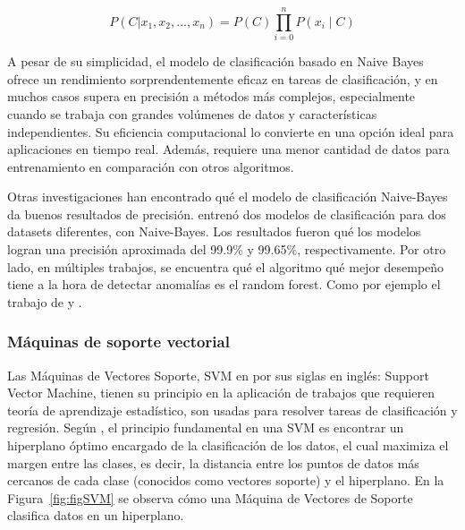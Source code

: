 \documentclass[11pt,a4paper,spanish]{book}
\numberwithin{equation}{chapter}
\numberwithin{figure}{chapter}
\begin{document}
\begin{equation}\label{eq:eq1NaiveBayesProd}
P(C|x_1, x_2, ..., x_n) = P(C) \prod_{i = 0}^{n} P(x_i \mid C)
\end{equation}


A pesar de su simplicidad, el modelo de clasificación basado en Naive Bayes ofrece un 
rendimiento sorprendentemente eficaz en tareas de clasificación, y en muchos casos 
supera en precisión a métodos más complejos, especialmente cuando se trabaja con 
grandes volúmenes de datos y características independientes. Su eficiencia computacional 
lo convierte en una opción ideal para aplicaciones en tiempo real. Además, requiere una 
menor cantidad de datos para entrenamiento en comparación con otros algoritmos.


Otras investigaciones han encontrado qué el modelo de clasificación Naive-Bayes da 
buenos resultados de precisión. \cite{chen2016xgboost} entrenó dos modelos de 
clasificación para dos datasets diferentes, con Naive-Bayes. Los resultados fueron qué 
los modelos logran una precisión aproximada del 99.9\% y 99.65\%, respectivamente. 
Por otro lado, en múltiples trabajos, se encuentra qué el algoritmo qué mejor desempeño 
tiene a la hora de detectar anomalías es el random forest. Como por ejemplo el trabajo 
de \cite{sharma2022predictive} y \cite{yu2025tkeo}.


\subsubsection{Máquinas de soporte vectorial}

Las Máquinas de Vectores Soporte, SVM en por sus siglas en inglés: Support Vector 
Machine, tienen su principio en la aplicación de trabajos que requieren teoría de 
aprendizaje estadístico, son usadas para resolver tareas de clasificación y regresión. 
Según \cite{amat2017maquinas}, el principio fundamental en una SVM es encontrar un 
hiperplano óptimo encargado de la clasificación de los datos, el cual maximiza el 
margen entre las clases, es decir, la distancia entre los puntos de datos más cercanos 
de cada clase (conocidos como vectores soporte) y el hiperplano. En la 
Figura~\ref{fig:figSVM} se observa cómo una Máquina de Vectores de Soporte clasifica 
datos en un hiperplano. 
\end{document}
